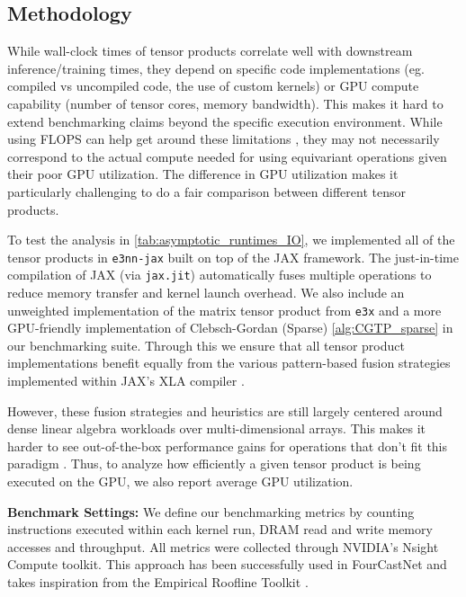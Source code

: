 \documentclass{article}
\theoremstyle{definition}
\theoremstyle{remark}
\begin{document}
\subsection{Methodology}
While wall-clock times of tensor products correlate well with downstream inference/training times, they depend on specific code implementations (eg. compiled vs uncompiled code, the use of custom kernels) or GPU compute capability (number of tensor cores, memory bandwidth). This makes it hard to extend benchmarking claims beyond the specific execution environment. While using FLOPS can help get around these limitations \citep{equivariancescale}, they may not necessarily correspond to the actual compute needed for using equivariant operations given their poor GPU utilization. The difference in GPU utilization makes it particularly challenging to do a fair comparison between different tensor products.


To test the analysis in \autoref{tab:asymptotic_runtimes_IO}, we implemented all of the tensor products in \texttt{e3nn-jax} built on top of the JAX \citep{jax2018github} framework. The just-in-time compilation of JAX (via \texttt{jax.jit}) automatically fuses multiple operations to reduce memory transfer and kernel launch overhead. We also include an unweighted implementation of the matrix tensor product from \texttt{e3x} and a more GPU-friendly implementation of Clebsch-Gordan (Sparse) \autoref{alg:CGTP_sparse} in our benchmarking suite. Through this we ensure that all tensor product implementations benefit equally from the various pattern-based fusion strategies implemented within JAX's XLA compiler \citep{xla,fusionxlaanalysis}.

However, these fusion strategies and heuristics are still largely centered around dense linear algebra workloads over multi-dimensional arrays. This makes it harder to see out-of-the-box performance gains for operations that don't fit this paradigm \citep{mlsysrut}. Thus, to analyze how efficiently a given tensor product is being executed on the GPU, 
we also report average GPU utilization.


\textbf{Benchmark Settings:}
We define our benchmarking metrics by counting instructions executed within each kernel run, DRAM read and write memory accesses and throughput. All metrics were collected through NVIDIA's Nsight Compute toolkit. This approach has been successfully used in FourCastNet \citep{fourcastnet} and takes inspiration from the Empirical Roofline Toolkit \citep{yang2020hierarchicalrooflineanalysiscollect}.
\end{document}
